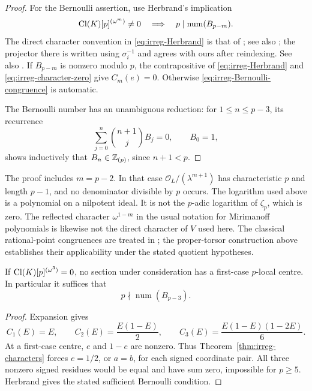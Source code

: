\begin{proof}
For the Bernoulli assertion, use Herbrand's implication
\begin{equation}
 \operatorname{Cl}(K)[p]^{(\omega^m)}\neq0
       \quad\Longrightarrow\quad
       p\mid\operatorname{num}(B_{p-m}).
 \label{eq:irreg-Herbrand}
\end{equation}
The direct character convention in \eqref{eq:irreg-Herbrand} is that
of \cite[Theorem~1.1 and following paragraph, p.~151]{Ribet1976}; see also \cite[Section~6.3, pp.~100--102, Theorem~6.17]{Washington1982};
the projector there is written using \(\sigma_i^{-1}\) and agrees
with ours after reindexing. See also
\cite[Theorem 3.7 and the following paragraph, pp.~104--105]{Gras2010}.
If \(B_{p-m}\) is nonzero modulo \(p\), the contrapositive of
\eqref{eq:irreg-Herbrand} and
\eqref{eq:irreg-character-zero} give \(C_m(e)=0\).
Otherwise \eqref{eq:irreg-Bernoulli-congruence} is automatic.

The Bernoulli number has an unambiguous reduction: for
\(1\leq n\leq p-3\), its recurrence
\[
 \sum_{j=0}^n\binom{n+1}{j}B_j=0,\qquad B_0=1,
\]
shows inductively that \(B_n\in\mathbb Z_{(p)}\), since \(n+1<p\).
\end{proof}

\begin{remark}\label{rem:irreg-endpoint}
The proof includes \(m=p-2\). In that case
\(\mathcal O_L/(\lambda^{m+1})\) has characteristic \(p\) and length
\(p-1\), and no denominator divisible by \(p\) occurs. The logarithm
used above is a polynomial on a nilpotent ideal. It is not the
\(p\)-adic logarithm of \(\zeta_p\), which is zero. The reflected
character \(\omega^{1-m}\) in the usual notation for Mirimanoff
polynomials is likewise not the direct character of \(V\) used
here. The classical rational-point congruences are treated in
\cite[Theorems 3.5 and 3.7]{Gras2010}; the proper-torsor construction
above establishes their applicability under the stated quotient
hypotheses.
\end{remark}

\begin{corollary}\label{cor:irreg-cubic}
If \(\operatorname{Cl}(K)[p]^{(\omega^3)}=0\), no section under consideration has a
first-case \(p\)-local centre. In particular it suffices that
\begin{equation}
 p\nmid\operatorname{num}(B_{p-3}).
 \label{eq:irreg-cubic-condition}
\end{equation}
\end{corollary}

\begin{proof}
Expansion gives
\[
 C_1(E)=E,\qquad C_2(E)=\frac{E(1-E)}2,\qquad
 C_3(E)=\frac{E(1-E)(1-2E)}6.
\]
At a first-case centre, \(e\) and \(1-e\) are nonzero. Thus
Theorem~\ref{thm:irreg-characters} forces \(e=1/2\), or \(a=b\), for
each signed coordinate pair. All three nonzero signed residues
would be equal and have sum zero, impossible for \(p\geq5\).
Herbrand gives the stated sufficient Bernoulli condition.
\end{proof}

